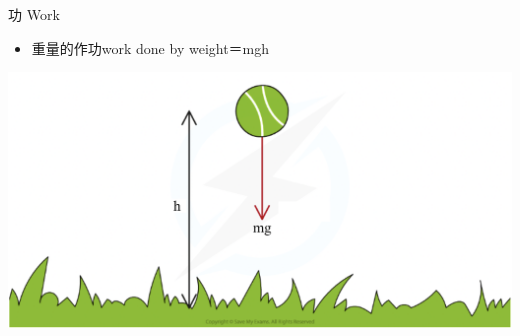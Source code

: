 \documentclass[beamer=true]{standalone}
\begin{document}

\begin{frame}{功 Work}
    \begin{itemize}
        \item 重量的作功work done by weight＝mgh
    \end{itemize}

    {\par\centering
    \includegraphics[width=.8\textwidth]{assets/55ada19f.png}
    \par}
\end{frame}
\end{document}
